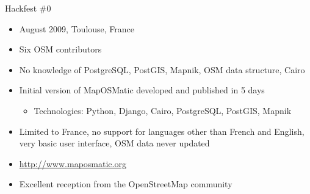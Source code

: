 \documentclass{beamer}
\begin{document}
\begin{frame}{Hackfest \#0}
  \begin{itemize}
  \item August 2009, Toulouse, France
  \item Six OSM contributors
  \item No knowledge of PostgreSQL, PostGIS, Mapnik, OSM data
    structure, Cairo
  \item Initial version of MapOSMatic developed and published in 5 days
    \begin{itemize}
    \item Technologies: Python, Django, Cairo, PostgreSQL, PostGIS, Mapnik
    \end{itemize}
  \item Limited to France, no support for languages other than French
    and English, very basic user interface, OSM data never updated
  \item \url{http://www.maposmatic.org}
  \item Excellent reception from the OpenStreetMap community
  \end{itemize}
\end{frame}
\end{document}
